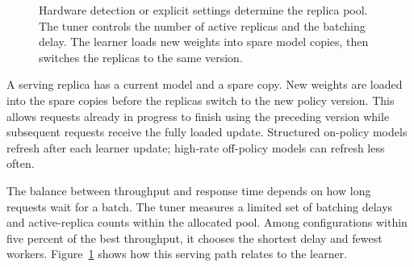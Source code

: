 \documentclass{strategynet-journal}
\begin{document}
\begin{figure}[H]
\centering
{}%
\caption{Hardware detection or explicit settings determine the replica pool.
The tuner controls the number of active replicas and the batching delay.  The
learner loads new weights into spare model copies, then switches the replicas
to the same version.}
\label{fig:inference-load-balancing}
\end{figure}

A serving replica has a current model and a spare copy. New weights are loaded
into the spare copies before the replicas switch to the new policy version.
This allows requests already in progress to finish using the preceding version
while subsequent requests receive the fully loaded update. Structured on-policy
models refresh after each learner update; high-rate off-policy models can
refresh less often.

The balance between throughput and response time depends on how long requests
wait for a batch. The tuner measures a limited set of batching delays and
active-replica counts within the allocated pool. Among configurations within
five percent of the best throughput, it chooses the shortest delay and fewest
workers. Figure~\ref{fig:inference-load-balancing} shows how this serving path
relates to the learner.
\end{document}
